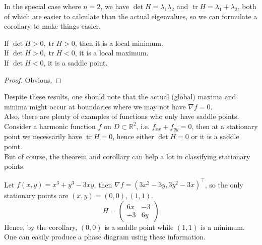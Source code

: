 In the special case where $n=2$, we have $\det H=\lambda_1\lambda_2$ and $\operatorname{tr} H=\lambda_1+\lambda_2$, both of which are easier to calculate than the actual eigenvalues, so we can formulate a corollary to make things easier.
\begin{corollary}
    If $\det H>0,\operatorname{tr}H>0$, then it is a local minimum.\\
    If $\det H>0,\operatorname{tr}H<0$, it is a local maximum.\\
    If $\det H<0$, it is a saddle point.
\end{corollary}
\begin{proof}
    Obvious.
\end{proof}
Despite these results, one should note that the actual (global) maxima and minima might occur at boundaries where we may not have $\nabla f=0$.\\
Also, there are plenty of examples of functions who only have saddle points.
Consider a harmonic function $f$ on $D\subset\mathbb R^2$, i.e. $f_{xx}+f_{yy}=0$, then at a stationary point we necessarily have $\operatorname{tr}H=0$, hence either $\det H=0$ or it is a saddle point.\\
But of course, the theorem and corollary can help a lot in classifying stationary points.
\begin{example}
    Let $f(x,y)=x^3+y^3-3xy$, then $\nabla f=(3x^2-3y,3y^2-3x)^\top$, so the only stationary points are $(x,y)=(0,0),(1,1)$.
    $$H=\begin{pmatrix}
        6x&-3\\
        -3&6y
    \end{pmatrix}$$
    Hence, by the corollary, $(0,0)$ is a saddle point while $(1,1)$ is a minimum.
    One can easily produce a phase diagram using these information.
\end{example}
